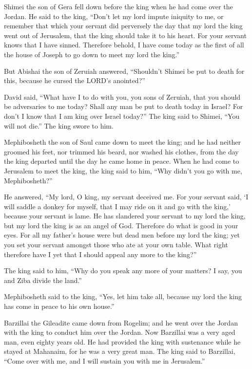 Shimei the son of Gera fell down before the king when he had come over
the Jordan.  He said to the king, ``Don't let my lord
impute iniquity to me, or remember that which your servant did
perversely the day that my lord the king went out of Jerusalem, that the
king should take it to his heart.  For your servant knows
that I have sinned. Therefore behold, I have come today as the first of
all the house of Joseph to go down to meet my lord the king.''

 But Abishai the son of Zeruiah answered, ``Shouldn't
Shimei be put to death for this, because he cursed the LORD's
anointed?''

 David said, ``What have I to do with you, you sons of
Zeruiah, that you should be adversaries to me today? Shall any man be
put to death today in Israel? For don't I know that I am king over
Israel today?''  The king said to Shimei, ``You will not
die.'' The king swore to him.

 Mephibosheth the son of Saul came down to meet the king;
and he had neither groomed his feet, nor trimmed his beard, nor washed
his clothes, from the day the king departed until the day he came home
in peace.  When he had come to Jerusalem to meet the
king, the king said to him, ``Why didn't you go with me, Mephibosheth?''

 He answered, ``My lord, O king, my servant deceived me.
For your servant said, `I will saddle a donkey for myself, that I may
ride on it and go with the king,' because your servant is lame.
 He has slandered your servant to my lord the king, but
my lord the king is as an angel of God. Therefore do what is good in
your eyes.  For all my father's house were but dead men
before my lord the king; yet you set your servant amongst those who ate
at your own table. What right therefore have I yet that I should appeal
any more to the king?''

 The king said to him, ``Why do you speak any more of
your matters? I say, you and Ziba divide the land.''

 Mephibosheth said to the king, ``Yes, let him take all,
because my lord the king has come in peace to his own house.''

 Barzillai the Gileadite came down from Rogelim; and he
went over the Jordan with the king to conduct him over the Jordan.
 Now Barzillai was a very aged man, even eighty years
old. He had provided the king with sustenance while he stayed at
Mahanaim, for he was a very great man.  The king said to
Barzillai, ``Come over with me, and I will sustain you with me in
Jerusalem.''

